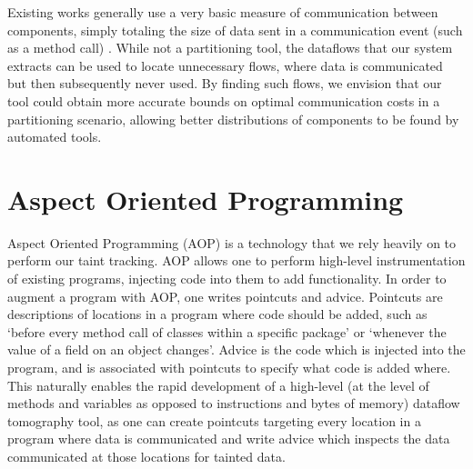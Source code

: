 \documentclass[msc,oneside]{ubcthesis}
\begin{document}
	Existing works generally use a very basic measure of communication between components, simply totaling the size of data sent in a communication event (such as a method call) \cite{Nahrstedt2003} \cite{Ou2007} \cite{Hajjat2010} \cite{Chun2010} \cite{Chun2011}. While not a partitioning tool, the dataflows that our system extracts can be used to locate unnecessary flows, where data is communicated but then subsequently never used. By finding such flows, we envision that our tool could obtain more accurate bounds on optimal communication costs in a partitioning scenario, allowing better distributions of components to be found by automated tools.
		
\section{Aspect Oriented Programming}
	Aspect Oriented Programming (AOP) \cite{Kiczales1997} is a technology that we rely heavily on to perform our taint tracking. AOP allows one to perform high-level instrumentation of existing programs, injecting code into them to add functionality. In order to augment a program with AOP, one writes pointcuts and advice. Pointcuts are descriptions of locations in a program where code should be added, such as `before every method call of classes within a specific package' or `whenever the value of a field on an object changes'. Advice is the code which is injected into the program, and is associated with pointcuts to specify what code is added where. This naturally enables the rapid development of a high-level (at the level of methods and variables as opposed to instructions and bytes of memory) dataflow tomography tool, as one can create pointcuts targeting every location in a program where data is communicated and write advice which inspects the data communicated at those locations for tainted data.
\end{document}
